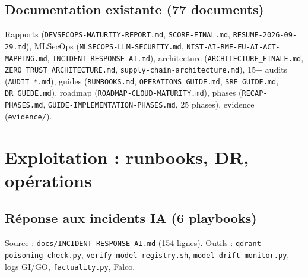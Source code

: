 \documentclass[12pt,a4paper,openany]{report}
\begin{document}
\section{Documentation existante (77 documents)}

Rapports (\texttt{DEVSECOPS-MATURITY-REPORT.md}, \texttt{SCORE-FINAL.md},
\texttt{RESUME-2026-09-29.md}), MLSecOps (\texttt{MLSECOPS-LLM-SECURITY.md},
\texttt{NIST-AI-RMF-EU-AI-ACT-MAPPING.md}, \texttt{INCIDENT-RESPONSE-AI.md}),
architecture (\texttt{ARCHITECTURE\_FINALE.md}, \texttt{ZERO\_TRUST\_ARCHITECTURE.md},
\texttt{supply-chain-architecture.md}), 15+ audits (\texttt{AUDIT\_*.md}),
guides (\texttt{RUNBOOKS.md}, \texttt{OPERATIONS\_GUIDE.md}, \texttt{SRE\_GUIDE.md}, \texttt{DR\_GUIDE.md}),
roadmap (\texttt{ROADMAP-CLOUD-MATURITY.md}), phases (\texttt{RECAP-PHASES.md},
\texttt{GUIDE-IMPLEMENTATION-PHASES.md}, 25 phases), evidence (\texttt{evidence/}).

\chapter{Exploitation : runbooks, DR, opérations}
\label{ch:exploitation}

\section{Réponse aux incidents IA (6 playbooks)}

Source : \texttt{docs/INCIDENT-RESPONSE-AI.md} (154 lignes).
Outils : \texttt{qdrant-poisoning-check.py}, \texttt{verify-model-registry.sh},
\texttt{model-drift-monitor.py}, logs GI/GO, \texttt{factuality.py}, Falco.
\end{document}
